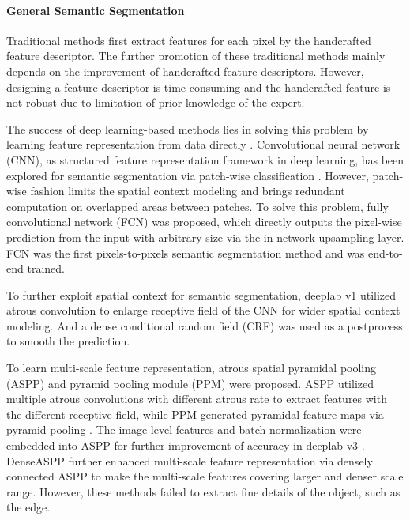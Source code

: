 \documentclass[10pt,twocolumn,letterpaper]{article}
\begin{document}
\paragraph{General Semantic Segmentation}

Traditional methods first extract features for each pixel by the handcrafted feature descriptor.
The further promotion of these traditional methods mainly depends on the improvement of handcrafted feature descriptors.
However, designing a feature descriptor is time-consuming and the handcrafted feature is not robust due to limitation of prior knowledge of the expert.

The success of deep learning-based methods lies in solving this problem by learning feature representation from data directly \cite{farabet2012learning}.
Convolutional neural network (CNN), as structured feature representation framework in deep learning, has been explored for semantic segmentation via patch-wise classification \cite{ciresan2012deep,farabet2012learning,hariharan2014simultaneous,gupta2014learning,pinheiro2014recurrent}.
However, patch-wise fashion limits the spatial context modeling and brings redundant computation on overlapped areas between patches.
To solve this problem, fully convolutional network (FCN) \cite{long2015fully} was proposed, which directly outputs the pixel-wise prediction from the input with arbitrary size via the in-network upsampling layer.
FCN was the first pixels-to-pixels semantic segmentation method and was end-to-end trained.


To further exploit spatial context for semantic segmentation, deeplab v1 \cite{chen2014semantic} utilized atrous convolution to enlarge receptive field of the CNN for wider spatial context modeling.
And a dense conditional random field (CRF) was used as a postprocess to smooth the prediction.


To learn multi-scale feature representation, atrous spatial pyramidal pooling (ASPP) \cite{chen2017deeplab} and pyramid pooling module (PPM) \cite{zhao2017pyramid} were proposed.
ASPP utilized multiple atrous convolutions with different atrous rate to extract features with the different receptive field, while PPM generated pyramidal feature maps via pyramid pooling \cite{he2015spatial}.
The image-level features and batch normalization were embedded into ASPP for further improvement of accuracy in deeplab v3 \cite{chen2017rethinking}.
DenseASPP \cite{yang2018denseaspp} further enhanced multi-scale feature representation via densely connected ASPP to make the multi-scale features covering larger and denser scale range.
However, these methods failed to extract fine details of the object, such as the edge.
\end{document}

